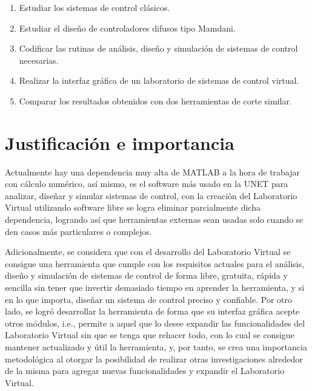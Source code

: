 		\begin{enumerate}[leftmargin=\parindent]
			
			\item Estudiar los sistemas de control clásicos.
			
			\item Estudiar el diseño de controladores difusos tipo Mamdani.
			
			\item Codificar las rutinas de análisis, diseño y simulación de sistemas de control necesarias.
			
			\item Realizar la interfaz gráfica de un laboratorio de sistemas de control virtual.
			
			\item Comparar los resultados obtenidos con dos herramientas de corte similar.
		
	\end{enumerate}

\section{Justificación e importancia}
	
	Actualmente hay una dependencia muy alta de MATLAB a la hora de trabajar con cálculo numérico, así mismo, es el software más usado en la UNET para analizar, diseñar y simular sistemas de control, con la creación del Laboratorio Virtual utilizando software libre se logra eliminar parcialmente dicha dependencia, logrando así que herramientas externas sean usadas solo cuando se den casos más particulares o complejos.
	
	Adicionalmente, se considera que con el desarrollo del Laboratorio Virtual se consigue una herramienta que cumple con los requisitos actuales para el análisis, diseño y simulación de sistemas de control de forma libre, gratuita, rápida y sencilla sin tener que invertir demasiado tiempo en aprender la herramienta, y si en lo que importa, diseñar un sistema de control preciso y confiable. Por otro lado, se logró desarrollar la herramienta de forma que su interfaz gráfica acepte otros módulos, i.e., permite a aquel que lo desee expandir las funcionalidades del Laboratorio Virtual sin que se tenga que rehacer todo, con lo cual se consigue mantener actualizado y útil la herramienta, y, por tanto, se crea una importancia metodológica al otorgar la posibilidad de realizar otras investigaciones alrededor de la misma para agregar nuevas funcionalidades y expandir el Laboratorio Virtual.
	
